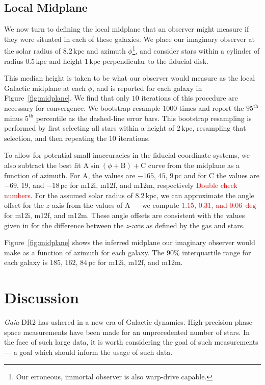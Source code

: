 \documentclass[twocolumn]{aastex62}
\newcommand{\Gus}[1]{\textcolor{red}{#1}}
\newcommand{\pc}{\text{pc}}
\newcommand{\kpc}{\text{kpc}}
\begin{document}
\subsection{Local Midplane} \label{sec:local_midplane}
We now turn to defining the local midplane that an observer might measure if
they were situated in each of these galaxies. We place our imaginary observer
at the solar radius of $8.2\,\kpc$ and azimuth $\phi$\footnote{Our erroneous,
immortal observer is also warp-drive capable.}, and consider stars within a
cylinder of radius $0.5\,\kpc$ and height $1\,\kpc$ perpendicular to the
fiducial disk.

This median height is taken to be what our observer would measure as the local
Galactic midplane at each $\phi$, and is reported for each galaxy in
Figure~\ref{fig:midplane}. We find that only $10$ iterations of this procedure
are necessary for convergence. We bootstrap resample $1000$ times and report
the $95^{\text{th}}$ minus $5^{\text{th}}$ percentile as the dashed-line error
bars. This bootstrap resampling is performed by first selecting all stars
within a height of $2\,\kpc$, resampling that selection, and then repeating
the $10$ iterations.

To allow for potential small inaccuracies in the fiducial coordinate systems,
we also subtract the best fit $\text{A} \sin{\left(\phi + \text{B}\right)} +
\text{C}$ curve from the midplane as a function of azimuth. For $\text{A}$,
the values are $-165$, $45$, $9\,\pc$ and for $\text{C}$ the values are $-69$,
$19$, and $-18\,\pc$ for m12i, m12f, and m12m, respectively \Gus{Double check
numbers}. For the assumed solar radius of $8.2\,\kpc$, we can approximate the
angle offset for the $z$-axis from the values of $\text{A}$ --- we compute
\Gus{$1.15$, $0.31$, and $0.06\,\deg$} for m12i, m12f, and m12m. These angle
offsets are consistent with the values given in \citet{2018arXiv180610564S}
for the difference between the $z$-axis as defined by the gas and stars.

Figure~\ref{fig:midplane} shows the inferred midplane our imaginary observer
would make as a function of azimuth for each galaxy. The $90\%$ interquartile
range for each galaxy is $185$, $162$, $84\,\pc$ for m12i, m12f, and m12m. 

\begin{figure*}
\caption{Caption.}
\label{fig:midplane}
\end{figure*}

\section{Discussion} \label{sec:discussion}
{\em Gaia} DR2 has ushered in a new era of Galactic dynamics. High-precision
phase space measurements have been made for an unprecedented number of stars.
In the face of such large data, it is worth considering the goal of such
measurements --- a goal which should inform the usage of such data.
\end{document}
